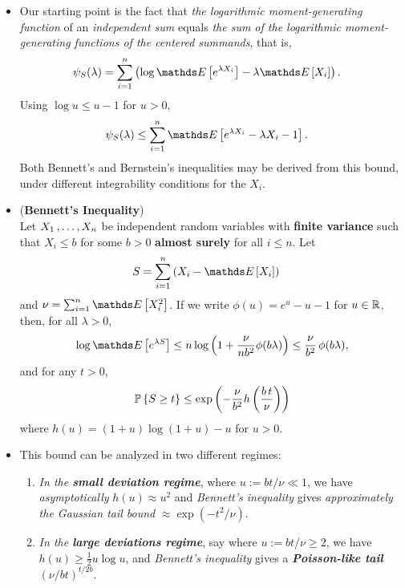 \documentclass[11pt]{article}
\begin{document}
\begin{itemize}
\item \begin{remark}
Our starting point is the fact that  \emph{the logarithmic moment-generating function} of an \emph{independent sum} equals \emph{the sum of the logarithmic moment-generating functions of the centered summands}, that is,
\begin{align*}
\psi_{S}(\lambda) &=  \sum_{i=1}^{n}\paren{\log\E{}{e^{\lambda X_i}} - \lambda \E{}{X_i}}.
\end{align*}
Using $\log u \le u - 1$ for $u > 0$,
\begin{align}
\psi_{S}(\lambda) &\le \sum_{i=1}^{n}\E{}{e^{\lambda X_i} - \lambda X_i - 1}. \label{ineqn: log_mgf_bound}
\end{align}
Both Bennett's and Bernstein's inequalities may be derived from this bound, under different integrability conditions for the $X_i$.
\end{remark}

\item \begin{proposition} (\textbf{Bennett's Inequality}) \citep{boucheron2013concentration}\\
Let $X_1 \,{,}\ldots{,}\, X_n$ be independent random variables with \textbf{finite variance} such that $X_i \le b$ for some $b > 0$ \textbf{almost surely} for all $i \le n$. Let
\begin{align*}
S &= \sum_{i=1}^{n}\paren{X_i - \E{}{X_i}}
\end{align*} and $\nu = \sum_{i=1}^{n}\E{}{X_i^2}$. If we write $\phi(u) = e^u - u - 1$ for $u \in {\mathbb R}$, then, for all $\lambda > 0$,
\begin{align*}
\log \E{}{e^{\lambda S}} \le n \log\paren{1 + \frac{\nu}{n b^2}\phi(b \lambda)} \le \frac{\nu}{b^2}\,\phi(b\lambda),
\end{align*}
and for any $t > 0$,
\begin{align}
{\mathbb P}\left\{S \ge t\right\} \le \exp\left(-\frac{\nu}{b^2}h\left(\frac{b\,t}{\nu}\right)\right) \label{ineqn: bennett_inequality}
\end{align}
where $h(u) = (1 + u) \log(1 + u) - u$ for $u > 0$.
\end{proposition}


\item \begin{remark} This bound can be analyzed in two different regimes:
\begin{enumerate}
\item \emph{In the \textbf{small deviation regime}}, where $u := b t/ \nu \ll 1$, we have \emph{asymptotically} $h(u) \approx u^2$ and \emph{Bennett's inequality} gives \emph{approximately the Gaussian tail bound} $\approx \exp(-t^2/\nu)$. 

\item \emph{In the \textbf{large deviations regime}}, say where $u := b t/ \nu \ge 2$, we have $h(u) \ge \frac{1}{2}u \log u$, and \emph{Bennett's inequality} gives a \emph{\textbf{Poisson-like tail}} $(\nu/bt)^{t/2 b}$.
\end{enumerate}
\end{remark}
\end{itemize}
\end{document}
